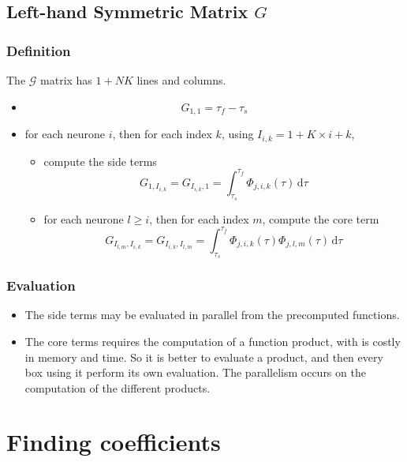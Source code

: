 \documentclass{revtex4}
\begin{document}
\subsection{Left-hand Symmetric Matrix ${G}$}
\subsubsection{Definition}
The $\mathcal{G}$ matrix has $1+NK$ lines and columns.
\begin{itemize}
	\item 
		$$ 
		{G}_{1,1} = \tau_f-\tau_s
		$$
	\item for each neurone $i$, then for each index $k$, using $I_{i,k}=1+K\times i + k$,
		\begin{itemize}
		\item compute the side terms
		$$
			{G}_{1,I_{i,k}} = {G}_{I_{i,k},1} = \int_{\tau_s}^{\tau_f} \Phi_{j,i,k}(\tau) \, \mathrm{d}\tau
		$$
		\item for each neurone $l\geq i$, then for each index $m$, compute the core term
		$$
			{G}_{I_{l,m},I_{i,k}} = {G}_{I_{i,k},I_{l,m}}  =
			\int_{\tau_s}^{\tau_f}  \Phi_{j,i,k}(\tau) \Phi_{j,l,m}(\tau) \, \mathrm{d}\tau
		$$
		\end{itemize}
\end{itemize}

\subsubsection{Evaluation}
\begin{itemize}
\item The side terms may be evaluated in parallel from the precomputed functions.

\item The core terms requires the computation of a function product, with is costly
in memory and time. So it is better to evaluate a product, and then 
every box using it perform its own evaluation.
 The parallelism occurs
on the computation of the different products.
\end{itemize}

\section{Finding coefficients}
\end{document}
